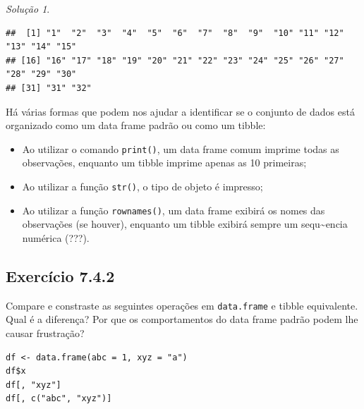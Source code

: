 \documentclass[
]{latex/krantz}
\providecommand{\tightlist}{%
  \setlength{\itemsep}{0pt}\setlength{\parskip}{0pt}}
\theoremstyle{definition}
\theoremstyle{definition}
\theoremstyle{definition}
\theoremstyle{definition}
\theoremstyle{remark}
\newtheorem*{solution}{Solução}
\begin{document}
\begin{solution}
\begin{verbatim}
##  [1] "1"  "2"  "3"  "4"  "5"  "6"  "7"  "8"  "9"  "10" "11" "12" "13" "14" "15"
## [16] "16" "17" "18" "19" "20" "21" "22" "23" "24" "25" "26" "27" "28" "29" "30"
## [31] "31" "32"
\end{verbatim}

Há várias formas que podem nos ajudar a identificar se o conjunto de dados está organizado como um data frame padrão ou como um tibble:

\begin{itemize}
\tightlist
\item
  Ao utilizar o comando \texttt{print()}, um data frame comum imprime todas as observações, enquanto um tibble imprime apenas as 10 primeiras;
\item
  Ao utilizar a função \texttt{str()}, o tipo de objeto é impresso;
\item
  Ao utilizar a função \texttt{rownames()}, um data frame exibirá os nomes das observações (se houver), enquanto um tibble exibirá sempre um sequ\textasciitilde encia numérica (???).
\end{itemize}

\end{solution}

\hypertarget{exr7-4-2}{%
\subsection*{Exercício 7.4.2}\label{exr7-4-2}}

Compare e constraste as seguintes operações em \texttt{data.frame} e tibble equivalente. Qual é a diferença? Por que os comportamentos do data frame padrão podem lhe causar frustração?

\begin{verbatim}
df <- data.frame(abc = 1, xyz = "a")
df$x
df[, "xyz"]
df[, c("abc", "xyz")]
\end{verbatim}
\end{document}
